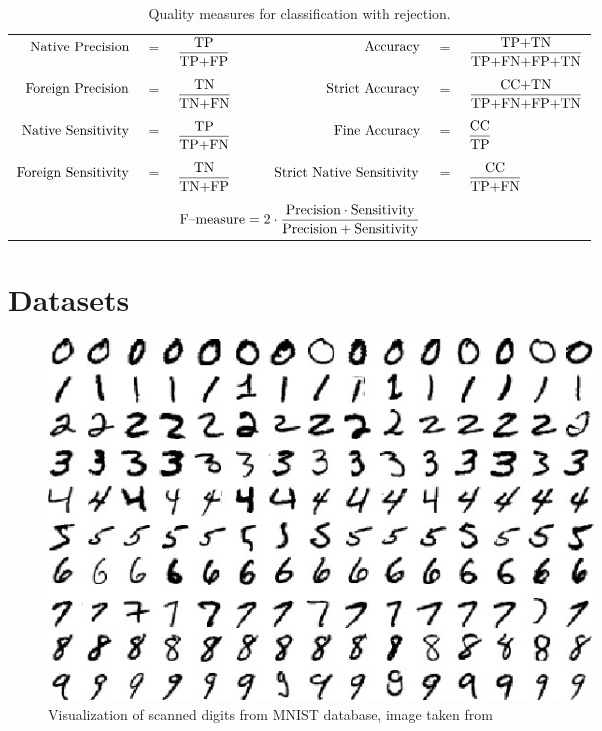 \begin{table}[!h]
	\centering
	\caption{Quality measures for classification with rejection.}
	\vspace{6pt}	
	{\footnotesize
		\begin{tabular}{rclrcl}
			$\textnormal{Native Precision}$ &$=$& $\displaystyle\frac{\textnormal{TP}}{\textnormal{TP+FP}}$ & 
			$\textnormal{Accuracy}$ &$=$& $\displaystyle\frac{\textnormal{TP+TN}}{\textnormal{TP+FN+FP+TN}}$ \\
			&&&&&\vspace{-3pt}\\
			$\textnormal{Foreign Precision}$ &$=$& $\displaystyle\frac{\textnormal{TN}}{\textnormal{TN+FN}}$ &
			$\textnormal{Strict Accuracy}$ &$=$& $\displaystyle\frac{\textnormal{CC+TN}}{\textnormal{TP+FN+FP+TN}}$ \\
			&&&&&\vspace{-3pt}\\
			$\textnormal{Native Sensitivity}$ &$=$& $\displaystyle\frac{\textnormal{TP}}{\textnormal{TP+FN}}$ &
			$\textnormal{Fine Accuracy}$ &$=$& $\displaystyle\frac{\textnormal{CC}}{\textnormal{TP}}$ \\
			&&&&&\vspace{-3pt}\\
			$\textnormal{Foreign Sensitivity}$ &$=$& $\displaystyle\frac{\textnormal{TN}}{\textnormal{TN+FP}}$ &
			$\hspace{18pt}\textnormal{Strict Native Sensitivity}$ &$=$& $\displaystyle\frac{\textnormal{CC}}{\textnormal{TP+FN}}$\\
			&&&&&\vspace{-3pt}\\
			\multicolumn{6}{c}{$\textnormal{F--measure}=2\cdot\displaystyle\frac{\textnormal{Precision}\cdot\textnormal{Sensitivity}}{\textnormal{Precision}+\textnormal{Sensitivity}}$}
		\end{tabular}
	}
	\label{tab:measures}
	\vspace{-12pt}
\end{table}

\section{Datasets} \label{datasets}

\begin{figure}[htp]
	\centering
	\includegraphics[width=0.7\textwidth]{Figures/mnistdigits.jpg}
	\caption{Visualization of scanned digits from MNIST database, image taken from \cite{Kuan_Hoong_Blog}}
	\label{fig:mnist_digits}\vspace{-3pt}
\end{figure}

